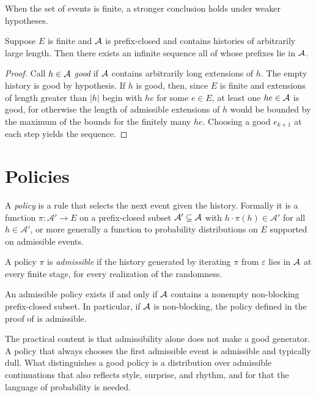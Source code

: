 When the set of events is finite, a stronger conclusion holds under weaker hypotheses.

\begin{proposition}[K\"onig]\label{prop:konig}
Suppose $E$ is finite and $\mathcal{A}$ is prefix-closed and contains histories of arbitrarily large length. Then there exists an infinite sequence all of whose prefixes lie in $\mathcal{A}$.
\end{proposition}

\begin{proof}
Call $h\in\mathcal{A}$ \emph{good} if $\mathcal{A}$ contains arbitrarily long extensions of $h$. The empty history is good by hypothesis. If $h$ is good, then, since $E$ is finite and extensions of length greater than $\lvert h\rvert$ begin with $he$ for some $e\in E$, at least one $he\in\mathcal{A}$ is good, for otherwise the length of admissible extensions of $h$ would be bounded by the maximum of the bounds for the finitely many $he$. Choosing a good $e_{k+1}$ at each step yields the sequence.
\end{proof}

\section{Policies}

A \emph{policy} is a rule that selects the next event given the history. Formally it is a function $\pi:\mathcal{A}'\to E$ on a prefix-closed subset $\mathcal{A}'\subseteq\mathcal{A}$ with $h\cdot\pi(h)\in\mathcal{A}'$ for all $h\in\mathcal{A}'$, or more generally a function to probability distributions on $E$ supported on admissible events.

\begin{definition}
A policy $\pi$ is \emph{admissible} if the history generated by iterating $\pi$ from $\varepsilon$ lies in $\mathcal{A}$ at every finite stage, for every realization of the randomness.
\end{definition}

\begin{corollary}\label{cor:policy}
An admissible policy exists if and only if $\mathcal{A}$ contains a nonempty non-blocking prefix-closed subset. In particular, if $\mathcal{A}$ is non-blocking, the policy defined in the proof of  is admissible.
\end{corollary}

The practical content is that admissibility alone does not make a good generator. A policy that always chooses the first admissible event is admissible and typically dull. What distinguishes a good policy is a distribution over admissible continuations that also reflects style, surprise, and rhythm, and for that the language of probability is needed.

